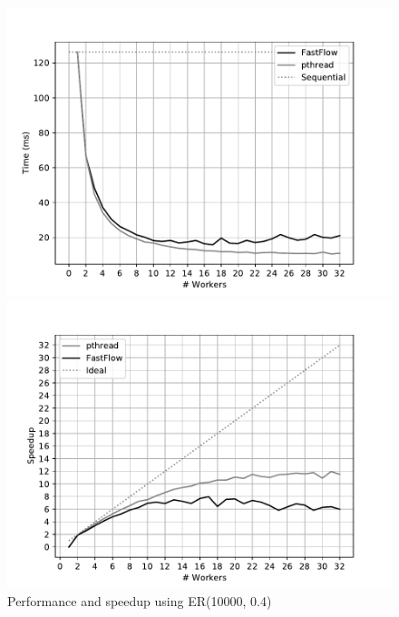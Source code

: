 \begin{figure}[!htb]
\begin{minipage}{0.48\textwidth}
        \includegraphics[width=\textwidth]{plots/fastflow_performance_04_time.pdf}
    \end{minipage}
    \begin{minipage}{0.48\textwidth}
        \includegraphics[width=\textwidth]{plots/fastflow_speedup_04_time.pdf}
    \end{minipage}
    \caption{Performance and speedup using ER(10000, 0.4)}
    \label{fig:perf_04}
    \begin{minipage}{1\textwidth}
    \end{minipage}
    \centering
    \begin{minipage}{0.48\textwidth}

\end{minipage}
\end{figure}
